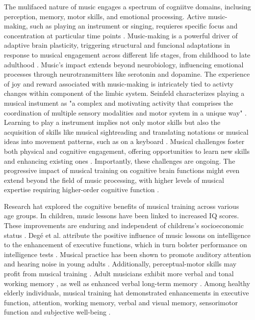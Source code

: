 The mulifaced nature of music engages a spectrum of cogniitve domains, inclusing perception, memory, motor skills, and emotional processing. Active music-making, such as playing an instrument or singing, requieres specific focus and concentration at particular time points \cite{Creech2013}. Music-making is a powerful driver of adaptive brain plasticity, triggering structural and funcional adaptations in response to musical engagement across different life stages, from childhood to late adulthood \cite{Altenmuller2020, Altenmuller2007}. Music's impact extends beyond neurobiology, influencing emotional processes through neurotransmitters like serotonin and dopamine. The experience of joy and reward associated with music-making is intricately tied to activty changes within component of the limbic system. Seinfeld characterizes playing a musical instument as "a complex and motivating activity that comprises the coordination of multiple sensory modalities and motor system in a unique way" \cite{Seinfeld2013}. Learning to play a instrument implies not only motor skills but also the acquisition of skills like musical sightreading and translating notations or musical ideas into movement patterns, such as on a keyboard \cite{Stewart2003}. Musical challenges foster both physical and cognitive engagement, offering opportunities to learn new skills and enhancing existing ones \cite{Creech2013}. Importantly, these challenges are ongoing. The progressive impact of musical training on cognitive brain functions might even extend beyond the field of music processing, with higher levels of musical expertise requiring higher-order cognitive function \cite{Oechslin2013a}.

Research hat explored the cognitive benefits of musical training across various age groups. In children, music lessons have been linked to increased IQ scores. These improvements are enduring and independent of childrens's socioeconomic status \cite{Schellenberg2006}. Degé et al. attribute the positive influence of music lessons on intelligence to the enhancement of executive functions, which in turn bolster performance on intelligence tests \cite{Dege2011}. Musical practice has been shown to promote auditory attention and hearing noise in young adults \cite{Strait2011}. Additionally, perceptual-motor skills may profit from musical training \cite{Seinfeld2013}. Adult musicians exhibit more verbal and tonal working memory \cite{Oechslin2013a}, as well as enhanced verbal long-term memory \cite{Chan1998}. Among healthy elderly individuals, musical training hat demonstrated enhancements in executive function, attention, working memory, verbal and visual memory, sensorimotor function and subjective well-being \cite{Seinfeld2013, Bugos2007, Dege2018}.

